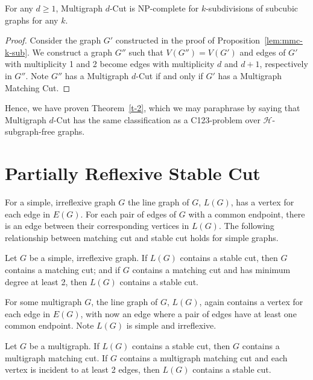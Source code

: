 \documentclass[a4paper,UKenglish,cleveref, autoref,thm-restate]{lipics-v2021}
\begin{document}
\begin{proposition}
    For any $d \geq 1$, {\sc Multigraph $d$-Cut} is NP-complete for $k$-subdivisions of subcubic graphs for any $k$.
\end{proposition}
\begin{proof}
    Consider the graph $G'$ constructed in the proof of Proposition~\ref{lem:mmc-k-sub}. We construct a graph $G''$ such that $V(G'') = V(G')$ and edges of $G'$ with multiplicity 1 and 2 become edges with multiplicity $d$ and $d+1$, respectively in $G''$. Note $G''$ has a {\sc Multigraph $d$-Cut} if and only if $G'$ has a {\sc Multigraph Matching Cut}.
\end{proof}

\noindent
Hence, we have proven Theorem~\ref{t-2}, which we may paraphrase by saying that {\sc Multigraph $d$-Cut} has the same classification as a C123-problem over $\mathcal{H}$-subgraph-free graphs.


\section{Partially Reflexive Stable Cut}\label{s-3}

For a simple, irreflexive graph $G$ the line graph of $G$, $L(G)$, has a vertex for each edge in $E(G)$. For each pair of edges of $G$ with a common endpoint, there is an edge between their corresponding vertices in $L(G)$. The following relationship between matching cut and stable cut holds for simple graphs.
\begin{theorem}
    Let $G$ be a simple, irreflexive graph. If $L(G)$ contains a stable cut, then $G$ contains a matching cut; and if $G$ contains a matching cut and has minimum degree at least 2, then $L(G)$ contains a stable cut.
\end{theorem}

For some multigraph $G$, the line graph of $G$, $L(G)$, again contains a vertex for each edge in $E(G)$, with now an edge where a pair of edges have at least one common endpoint. Note $L(G)$ is simple and irreflexive.
\begin{lemma}\label{lem:geqLG}
    Let $G$ be a multigraph. If $L(G)$ contains a stable cut, then $G$ contains a multigraph matching cut. If $G$ contains a multigraph matching cut and each vertex is incident to at least 2 edges, then $L(G)$ contains a stable cut.
\end{lemma}
\end{document}
